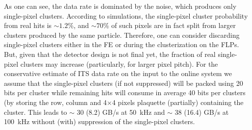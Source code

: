 As one can see, the data rate is dominated by the noise, which
produces only single-pixel clusters. According to simulations,
the single-pixel cluster probability from real hits is $\sim 1.2\%$, 
and $\sim 70\%$ of such pixels are in fact split from larger
clusters produced by the same particle. Therefore, one can consider
discarding single-pixel clusters either in the FE or during the
clusterization on the FLPs. But, given that the detector design is not
final yet, the fraction of real single-pixel clusters may 
increase (particularly, for larger pixel pitch). For the conservative estimate of ITS data rate on the 
input to the online system we assume that the single-pixel clusters (if
not suppressed) will be packed using 20 bits per cluster while
remaining hits will consume in average 40 bits per clusters (by
storing the row, column and 4$\times$4 pixels plaquette (partially)
containing the cluster. This leads to $\sim$ 30 (8.2) GB/s at 50~kHz and
$\sim$ 38 (16.4) GB/s at 100~kHz without (with) suppression of the single-pixel
clusters.
